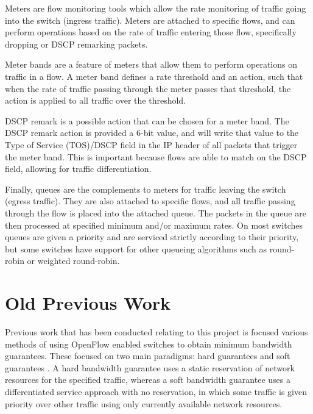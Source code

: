 \documentclass[accepted,single]{gipaper}
\begin{document}
Meters are flow monitoring tools which allow the rate monitoring of traffic going into the switch (ingress traffic). Meters are attached to specific flows, and can perform operations based on the rate of traffic entering those flow, specifically dropping or DSCP remarking packets.

Meter bands are a feature of meters that allow them to perform operations on traffic in a flow. A meter band defines a rate threshold and an action, such that when the rate of traffic passing through the meter passes that threshold, the action is applied to all traffic over the threshold.

DSCP remark is a possible action that can be chosen for a meter band. The DSCP remark action is provided a 6-bit value, and will write that value to the Type of Service (TOS)/DSCP field in the IP header of all packets that trigger the meter band. This is important because flows are able to match on the DSCP field, allowing for traffic differentiation.

Finally, queues are the complements to meters for traffic leaving the switch (egress traffic). They are also attached to specific flows, and all traffic passing through the flow is placed into the attached queue. The packets in the queue are then processed at specified minimum and/or maximum rates. On most switches queues are given a priority and are serviced strictly according to their priority, but some switches have support for other queueing algorithms such as round-robin or weighted round-robin.


\iffalse
\section{Old Previous Work}
\label{oprev_work}

Previous work that has been conducted relating to this project is focused various methods of using OpenFlow enabled switches to obtain minimum bandwidth guarantees. These focused on two main paradigms: hard guarantees and soft guarantees \cite{softqos}. A hard bandwidth guarantee uses a static reservation of network resources for the specified traffic, whereas a soft bandwidth guarantee uses a differentiated service approach with no reservation, in which some traffic is given priority over other traffic using only currently available network resources. 
\end{document}
